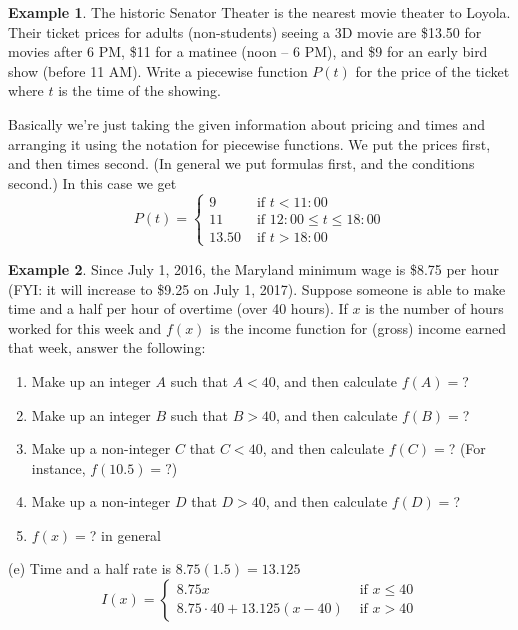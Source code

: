 \documentclass[oneside]{book}
\theoremstyle{definition}
\newtheorem{example}{Example}
\theoremstyle{solution}
\newtheorem*{solution}{Solution}
\newenvironment{solution}{\vspace{2in}\comment}{\endcomment}
\begin{document}
\begin{example}
  The historic Senator Theater is the nearest movie theater to Loyola.
  Their ticket prices for adults (non-students) seeing a 3D movie are
  \$13.50 for movies after 6 PM, \$11 for a matinee (noon -- 6 PM),
  and \$9 for an early bird show (before 11 AM).  Write a piecewise
  function $P(t)$ for the price of the ticket where $t$ is the time of
  the showing.
\end{example}

\begin{solution}
  Basically we're just taking the given information about pricing and
  times and arranging it using the notation for piecewise functions.
  We put the prices first, and then times second.  (In general we put
  formulas first, and the conditions second.)  In this case we get
$$ 
P(t) = 
\begin{cases}
9 & \text{ if }t< 11:00\\
11 & \text{ if }12:00 \le t \le 18:00\\
13.50 & \text{ if }t> 18:00
\end{cases}
$$
\end{solution}

\begin{example}
  Since July 1, 2016, the Maryland minimum wage is \$8.75 per hour
  (FYI: it will increase to \$9.25 on July 1, 2017).  Suppose someone
  is able to make time and a half per hour of overtime (over 40
  hours).  If $x$ is the number of hours worked for this week and
  $f(x)$ is the income function for (gross) income earned that week,
  answer the following:

\begin{enumerate}
\item Make up an integer $A$ such that $A<40$, and then calculate $f(A)=$?
\item Make up an integer $B$ such that $B>40$, and then calculate $f(B)=$?
\item Make up a non-integer $C$ that $C<40$, and then calculate
  $f(C)=$? (For instance, $f(10.5)=?$)
\item Make up a non-integer $D$ that $D>40$, and then calculate $f(D)=$?
\item $f(x) = $? in general
\end{enumerate}
\end{example}

\begin{solution} 
(e) Time and a half rate is $8.75(1.5) = 13.125$
$$
I(x) = 
\begin{cases} 
  8.75 x & \text{ if }x \le 40\\ 
  8.75\cdot 40 + 13.125(x-40) & \text{ if }x > 40 
\end{cases}
$$
\end{solution}
\end{document}
